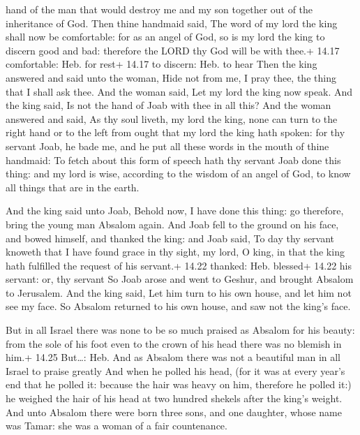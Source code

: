 hand of the man that would destroy me and my son together out of the
inheritance of God.  Then thine handmaid said, The word of
my lord the king shall now be comfortable: for as an angel of God, so is
my lord the king to discern good and bad: therefore the LORD thy God
will be with thee.+ 14.17 comfortable: Heb. for rest+ 14.17 to discern:
Heb. to hear  Then the king answered and said unto the
woman, Hide not from me, I pray thee, the thing that I shall ask thee.
And the woman said, Let my lord the king now speak.  And
the king said, Is not the hand of Joab with thee in all this? And the
woman answered and said, As thy soul liveth, my lord the king, none can
turn to the right hand or to the left from ought that my lord the king
hath spoken: for thy servant Joab, he bade me, and he put all these
words in the mouth of thine handmaid:  To fetch about this
form of speech hath thy servant Joab done this thing: and my lord is
wise, according to the wisdom of an angel of God, to know all things
that are in the earth.

 And the king said unto Joab, Behold now, I have done
this thing: go therefore, bring the young man Absalom again.
 And Joab fell to the ground on his face, and bowed
himself, and thanked the king: and Joab said, To day thy servant knoweth
that I have found grace in thy sight, my lord, O king, in that the king
hath fulfilled the request of his servant.+ 14.22 thanked: Heb. blessed+
14.22 his servant: or, thy servant  So Joab arose and went
to Geshur, and brought Absalom to Jerusalem.  And the king
said, Let him turn to his own house, and let him not see my face. So
Absalom returned to his own house, and saw not the king's face.

 But in all Israel there was none to be so much praised
as Absalom for his beauty: from the sole of his foot even to the crown
of his head there was no blemish in him.+ 14.25 But\ldots: Heb. And as
Absalom there was not a beautiful man in all Israel to praise greatly
 And when he polled his head, (for it was at every year's
end that he polled it: because the hair was heavy on him, therefore he
polled it:) he weighed the hair of his head at two hundred shekels after
the king's weight.  And unto Absalom there were born three
sons, and one daughter, whose name was Tamar: she was a woman of a fair
countenance.

